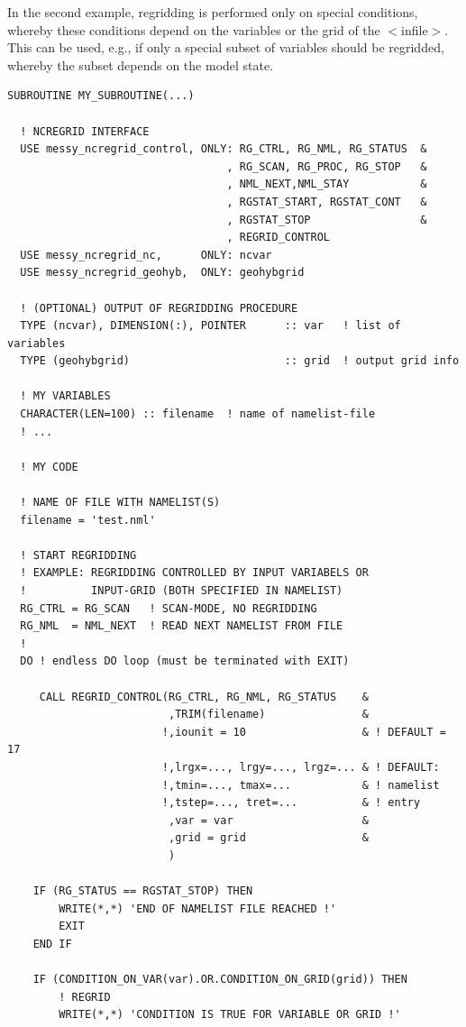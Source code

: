 \documentclass[12pt, a4paper]{article}
\begin{document}
In the second example, regridding is performed only on special conditions,
whereby these conditions depend on the variables or the grid of the
$<$infile$>$. 
This can be used, e.g., if only a special subset of variables
should be regridded, whereby the subset depends on the model state. 
% 
\begin{verbatim}
SUBROUTINE MY_SUBROUTINE(...)

  ! NCREGRID INTERFACE
  USE messy_ncregrid_control, ONLY: RG_CTRL, RG_NML, RG_STATUS  &
                                  , RG_SCAN, RG_PROC, RG_STOP   &
                                  , NML_NEXT,NML_STAY           &
                                  , RGSTAT_START, RGSTAT_CONT   &
                                  , RGSTAT_STOP                 &
                                  , REGRID_CONTROL
  USE messy_ncregrid_nc,      ONLY: ncvar
  USE messy_ncregrid_geohyb,  ONLY: geohybgrid
 
  ! (OPTIONAL) OUTPUT OF REGRIDDING PROCEDURE
  TYPE (ncvar), DIMENSION(:), POINTER      :: var   ! list of variables
  TYPE (geohybgrid)                        :: grid  ! output grid info 

  ! MY VARIABLES
  CHARACTER(LEN=100) :: filename  ! name of namelist-file
  ! ...

  ! MY CODE

  ! NAME OF FILE WITH NAMELIST(S)
  filename = 'test.nml'

  ! START REGRIDDING
  ! EXAMPLE: REGRIDDING CONTROLLED BY INPUT VARIABELS OR
  !          INPUT-GRID (BOTH SPECIFIED IN NAMELIST)
  RG_CTRL = RG_SCAN   ! SCAN-MODE, NO REGRIDDING
  RG_NML  = NML_NEXT  ! READ NEXT NAMELIST FROM FILE
  !
  DO ! endless DO loop (must be terminated with EXIT)

     CALL REGRID_CONTROL(RG_CTRL, RG_NML, RG_STATUS    &
                         ,TRIM(filename)               & 
                        !,iounit = 10                  & ! DEFAULT = 17
                        !,lrgx=..., lrgy=..., lrgz=... & ! DEFAULT:
                        !,tmin=..., tmax=...           & ! namelist
                        !,tstep=..., tret=...          & ! entry
                         ,var = var                    &
                         ,grid = grid                  &
                         )

    IF (RG_STATUS == RGSTAT_STOP) THEN
        WRITE(*,*) 'END OF NAMELIST FILE REACHED !'
        EXIT
    END IF

    IF (CONDITION_ON_VAR(var).OR.CONDITION_ON_GRID(grid)) THEN
        ! REGRID
        WRITE(*,*) 'CONDITION IS TRUE FOR VARIABLE OR GRID !'


\end{verbatim}
\end{document}
